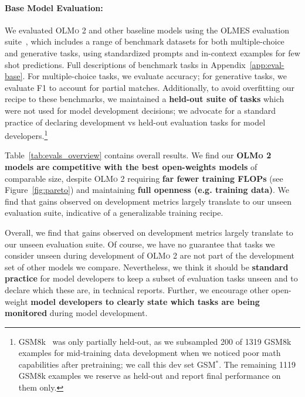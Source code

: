 \documentclass[table]{ai2style/ai2}
\newcommand{\olmotoo}{\textsc{OLMo 2}\xspace}
\begin{document}
\paragraph{Base Model Evaluation:} 
\label{sec:base-eval}
We evaluated \olmotoo and other baseline models using the OLMES evaluation suite~\citep{olmes}, which includes a range of benchmark datasets for both multiple-choice and generative tasks, using standardized prompts and in-context examples for few shot predictions. Full descriptions of benchmark tasks in Appendix~\ref{app:eval-base}.
For multiple-choice tasks, we evaluate accuracy; for generative tasks, we evaluate F1 to account for partial matches.
Additionally, to avoid overfitting our recipe to these benchmarks, we maintained a \textbf{held-out suite of tasks} which were not used for model development decisions; we advocate for a standard practice of declaring development vs held-out evaluation tasks for model developers.\footnote{GSM8k~\citep{cobbe2021trainingverifierssolvemath} was only partially held-out, as we subsampled 200 of 1319 GSM8k examples for mid-training data development when we noticed poor math capabilities after pretraining; we call this dev set GSM$^*$. The remaining 1119 GSM8k examples we reserve as held-out and report final performance on them only.}

Table~\ref{tab:evals_overview} contains overall results. 
We find our \textbf{\olmotoo models are competitive with the best open-weights models} of comparable size, despite \olmotoo requiring \textbf{far fewer training FLOPs} (see Figure~\ref{fig:pareto}) and maintaining \textbf{full openness (e.g. training data)}.
We find that gains observed on development metrics largely translate to our unseen evaluation suite, indicative of a generalizable training recipe. 

Overall, we find that gains observed on development metrics largely translate to our unseen evaluation suite. 
Of course, we have no guarantee that tasks we consider unseen during development of \olmotoo are not part of the development set of other models we compare. 
Nevertheless, we think it should be \textbf{standard practice} for model developers to keep a subset of evaluation tasks unseen and to declare which these are, in technical reports.
Further, we encourage other open-weight \textbf{model developers to clearly state which tasks are being monitored} during model development.
\end{document}

